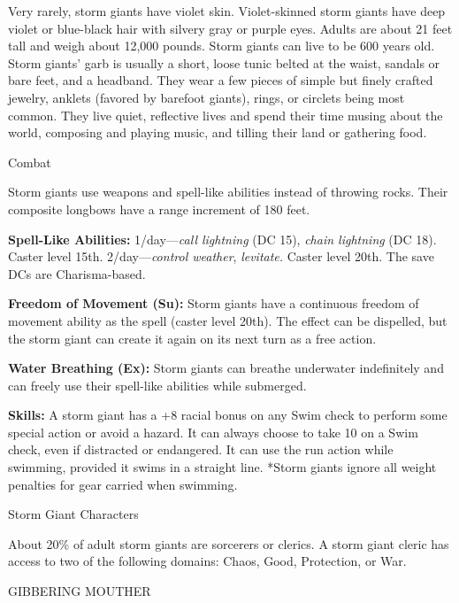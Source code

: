 \documentclass{article}
\begin{document}
Very rarely, storm giants have violet skin. Violet-skinned storm giants have deep 
violet or blue-black hair with silvery gray or purple eyes. Adults are about 21 
feet tall and weigh about 12,000 pounds. Storm giants can live to be 600 years 
old. Storm giants' garb is usually a short, loose tunic belted at the waist, sandals 
or bare feet, and a headband. They wear a few pieces of simple but finely crafted 
jewelry, anklets (favored by barefoot giants), rings, or circlets being most common. 
They live quiet, reflective lives and spend their time musing about the world, 
composing and playing music, and tilling their land or gathering food.

Combat

Storm giants use weapons and spell-like abilities instead of throwing rocks. Their 
composite longbows have a range increment of 180 feet.

\textbf{Spell-Like Abilities:} 1/day---\textit{call lightning }(DC 15), \textit{chain 
lightning }(DC 18). Caster level 15th. 2/day---\textit{control weather}, \textit{levitate. 
}Caster level 20th. The save DCs are Charisma-based.

\textbf{Freedom of Movement (Su):} Storm giants have a continuous freedom of movement 
ability as the spell (caster level 20th). The effect can be dispelled, but the 
storm giant can create it again on its next turn as a free action.

\textbf{Water Breathing (Ex):} Storm giants can breathe underwater indefinitely 
and can freely use their spell-like abilities while submerged.

\textbf{Skills:} A storm giant has a +8 racial bonus on any Swim check to perform 
some special action or avoid a hazard. It can always choose to take 10 on a Swim 
check, even if distracted or endangered. It can use the run action while swimming, 
provided it swims in a straight line. *Storm giants ignore all weight penalties 
for gear carried when swimming.

Storm Giant Characters

About 20\% of adult storm giants are sorcerers or clerics. A storm giant cleric 
has access to two of the following domains: Chaos, Good, Protection, or War.

\vspace{12pt}
{\LARGE{}GIBBERING MOUTHER}
\end{document}
